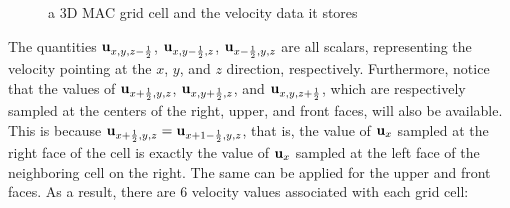\begin{figure}[!h]
\begin{tikzpicture}



        
         \end{tikzpicture}
    
    \caption{a 3D MAC grid cell and the velocity data it stores}
    \label{mac cell 1}
\end{figure}


The quantities $\u_{x,y,z-\frac{1}{2}}$, $\u_{x,y-\frac{1}{2},z}$, $\u_{x-\frac{1}{2},y,z}$ are all scalars, representing the velocity pointing at the $x$, $y$, and $z$ direction, respectively. Furthermore, notice that the values of $\u_{x+\frac{1}{2},y,z}$, $\u_{x,y+\frac{1}{2},z}$, and $\u_{x,y,z+\frac{1}{2}}$, which are respectively sampled at the centers of the right, upper, and front faces, will also be available. This is because $\u_{x+\frac{1}{2},y,z} = \u_{x+1-\frac{1}{2},y,z}$, that is, the value of $\u_x$ sampled at the right face of the cell is exactly the value of $\u_x$ sampled at the left face of the neighboring cell on the right. The same can be applied for the upper and front faces. As a result, there are 6 velocity values associated with each grid cell:

